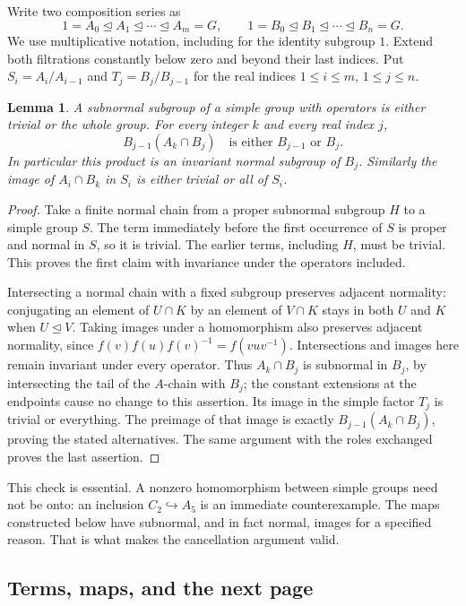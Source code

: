 \documentclass[11pt]{article}
\newtheorem{lemma}[theorem]{Lemma}
\theoremstyle{definition}
\theoremstyle{remark}\newtheorem{remark}[theorem]{Remark}
\newcommand{\nml}{\trianglelefteq}
\begin{document}
Write two composition series as
\[
1=A_0\nml A_1\nml\cdots\nml A_m=G,
\qquad
1=B_0\nml B_1\nml\cdots\nml B_n=G.
\]
We use multiplicative notation, including for the identity subgroup $1$.
Extend both filtrations constantly below zero and beyond their last
indices. Put $S_i=A_i/A_{i-1}$ and $T_j=B_j/B_{j-1}$ for the real
indices $1\leq i\leq m$, $1\leq j\leq n$.

\begin{lemma}\label{p:normality}
A subnormal subgroup of a simple group with operators is either trivial
or the whole group. For every integer $k$ and every real index $j$,
\[
 B_{j-1}(A_k\cap B_j)
 \quad\text{is either }B_{j-1}\text{ or }B_j.
\]
In particular this product is an invariant normal subgroup of $B_j$.
Similarly the image of $A_i\cap B_k$ in $S_i$ is either trivial or all
of $S_i$.
\end{lemma}
\begin{proof}
Take a finite normal chain from a proper subnormal subgroup $H$ to a
simple group $S$. The term immediately before the first occurrence of
$S$ is proper and normal in $S$, so it is trivial. The earlier terms,
including $H$, must be trivial. This proves the first claim with
invariance under the operators included.

Intersecting a normal chain with a fixed subgroup preserves adjacent
normality: conjugating an element of $U\cap K$ by an element of
$V\cap K$ stays in both $U$ and $K$ when $U\nml V$.
Taking images under a homomorphism also preserves adjacent normality,
since $f(v)f(u)f(v)^{-1}=f(vuv^{-1})$. Intersections and images here
remain invariant under every operator. Thus $A_k\cap B_j$ is subnormal
in $B_j$, by intersecting the tail of the $A$-chain with $B_j$; the
constant extensions at the endpoints cause no change to this assertion.
Its image in the simple factor $T_j$ is trivial or everything. The
preimage of that image is exactly $B_{j-1}(A_k\cap B_j)$, proving
the stated alternatives. The same argument with the roles exchanged
proves the last assertion.
\end{proof}

This check is essential. A nonzero homomorphism between simple groups
need not be onto: an inclusion $C_2\hookrightarrow A_5$ is an immediate
counterexample. The maps constructed below have subnormal, and in fact
normal, images for a specified reason. That is what makes the cancellation
argument valid.

\subsection{Terms, maps, and the next page}
\end{document}
